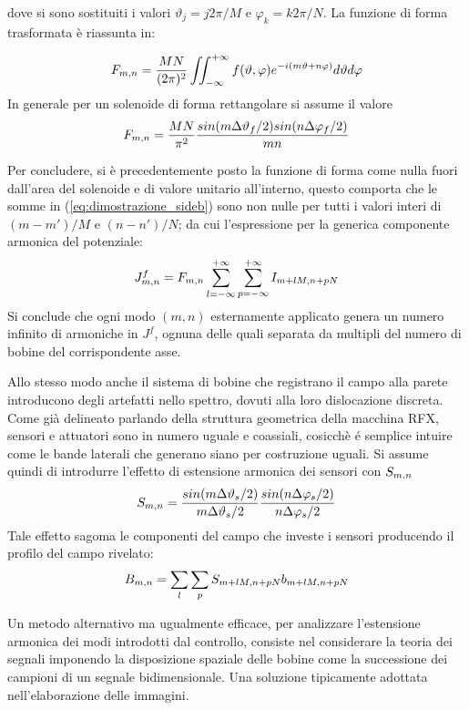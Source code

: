 dove si sono sostituiti i valori $\vartheta_j = j2\pi/M$ e
$\varphi_k=k2\pi/N$. La funzione di forma trasformata è riassunta in:

\begin{equation}
 F_{m,n} = \frac{MN}{(2\pi)^2}\iint_{-\infty}^{+\infty}
  f(\vartheta,\varphi)e^{-i(m\vartheta+n\varphi)} d\vartheta d\varphi
\end{equation}
In generale per un solenoide di forma rettangolare si assume il valore \cite{pizz81}
\begin{equation}
 \label{eq:shape_coils}
 F_{m,n} = \frac{MN}{\pi^2}\frac{sin(m\Delta\vartheta_f/2)sin(n\Delta\varphi_f/2)}{mn}
\end{equation}

Per concludere, si è precedentemente posto la funzione di forma come
nulla fuori dall'area del solenoide e di valore unitario all'interno,
questo comporta che le somme in (\ref{eq:dimostrazione_sideb}) sono non
nulle per tutti i valori interi di $(m-m')/M$ e $(n-n')/N$; da cui
l'espressione per la generica componente armonica del potenziale:
\begin{equation}
 J_{m,n}^f = F_{m,n} \sum_{l=-\infty}^{+\infty}\sum_{p=-\infty}^{+\infty} I_{m+lM,n+pN}
\end{equation}
Si conclude che ogni modo $(m,n)$ esternamente applicato genera un
numero infinito di armoniche in $J^f$, ognuna delle quali separata da
multipli del numero di bobine del corrispondente asse.

Allo stesso modo anche il sistema di bobine che registrano il campo alla
parete introducono degli artefatti nello spettro, dovuti alla loro
dislocazione discreta. Come già delineato parlando della struttura
geometrica della macchina RFX, sensori e attuatori sono in numero uguale
e coassiali, cosicchè é semplice intuire come le bande laterali che
generano siano per costruzione uguali. Si assume quindi di introdurre
l'effetto di estensione armonica dei sensori con $S_{m,n}$ \cite{pizz_81}
\begin{equation}
 \label{eq:shape_sensori}
 S_{m,n} = \frac{sin(m\Delta\vartheta_s/2)}{m\Delta\vartheta_s/2}
\frac{sin(n\Delta\varphi_s/2)}{n\Delta\varphi_s/2}
\end{equation}
Tale effetto sagoma le componenti del campo che investe i sensori
producendo il profilo del campo rivelato:
\begin{equation}
 B_{m,n} = \sum_l \sum_p S_{m+lM,n+pN} b_{m+lM,n+pN}
\end{equation}

Un metodo alternativo ma ugualmente efficace, per analizzare l'estensione
armonica dei modi introdotti dal controllo, consiste nel considerare la
teoria dei segnali imponendo la disposizione spaziale delle bobine come
la successione dei campioni di un segnale bidimensionale. Una soluzione
tipicamente adottata nell'elaborazione delle immagini.

